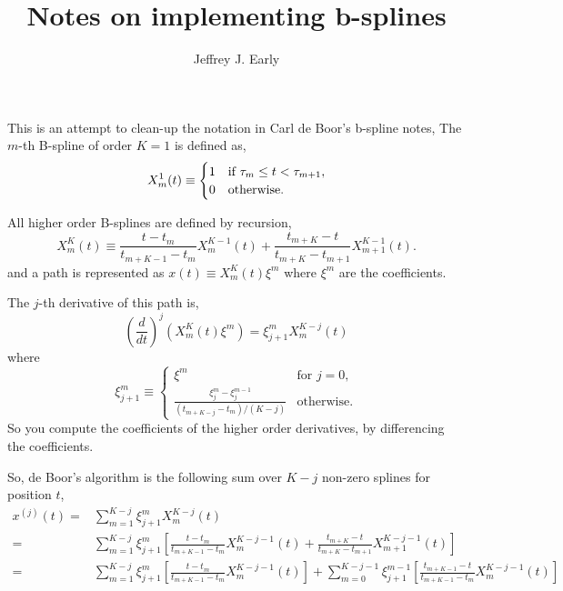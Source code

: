 \documentclass[11pt, oneside]{article}   	%
\title{Notes on implementing b-splines}
\author{Jeffrey J. Early}
\begin{document}
\maketitle

This is an attempt to clean-up the notation in Carl de Boor's b-spline notes,
The $m$-th B-spline of order $K=1$ is defined as,
\begin{equation}
X^1_m(t) \equiv \begin{cases}
1      & \text{if $ \tau_m \leq t < \tau_{m+1}$}, \\
0     & \text{otherwise}.
\end{cases}
\end{equation}

All higher order B-splines are defined by recursion,
\begin{equation}
X^K_m(t) \equiv \frac{t - t_m}{t_{m+K-1} - t_m} X^{K-1}_m(t) + \frac{t_{m+K}-t}{t_{m+K} - t_{m+1}} X^{K-1}_{m+1}(t).
\end{equation}
and a path is represented as $x(t) \equiv  X^K_m(t) \xi^m$ where $\xi^m$ are the coefficients.

The $j$-th derivative of this path is,
\begin{equation}
\left(\frac{d}{dt}\right)^j \left(X^K_m(t) \xi^m\right) = \xi_{j+1}^m X^{K-j}_m(t)
\end{equation}
where 
\begin{equation}
\xi_{j+1}^m \equiv \begin{cases}
\xi^m      & \text{for $j=0$}, \\
\frac{\xi_j^m - \xi_j^{m-1}}{ (t_{m+K-j} - t_m)/(K-j) }    & \text{otherwise}.
\end{cases}
\end{equation}
So you compute the coefficients of the higher order derivatives, by differencing the coefficients.

So, de Boor's algorithm is the following sum over $K-j$ non-zero splines for position $t$,
\begin{align}
x^{(j)}(t) =& \sum_{m=1}^{K-j} \xi_{j+1}^m X^{K-j}_m(t) \\
=&  \sum_{m=1}^{K-j} \xi_{j+1}^m \left[ \frac{t - t_m}{t_{m+K-1} - t_m} X^{K-j-1}_m(t) + \frac{t_{m+K}-t}{t_{m+K} - t_{m+1}} X^{K-j-1}_{m+1}(t) \right] \\
=& \sum_{m=1}^{K-j} \xi_{j+1}^m \left[ \frac{t - t_m}{t_{m+K-1} - t_m} X^{K-j-1}_m(t) \right] +  \sum_{m=0}^{K-j-1} \xi_{j+1}^{m-1} \left[ \frac{t_{m+K-1}-t}{t_{m+K-1} - t_{m}} X^{K-j-1}_{m}(t) \right] 
\end{align}
\end{document}
